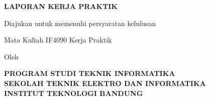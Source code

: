 \begin{titlepage}
\begin{center}
\vspace*{0.3cm}
{\bfseries\Large LAPORAN KERJA PRAKTIK\par}
\vspace{0.7cm}
{\bfseries\large \JudulLaporan\par}
\vspace{0.8cm}
{Diajukan untuk memenuhi persyaratan kelulusan\par Mata Kuliah IF4090 Kerja Praktik\par}
\vspace{0.6cm}
{Oleh\par}
\vspace{0.2cm}
\NamaBerdua
\vfill
\LogoITB
\vfill
{\bfseries PROGRAM STUDI TEKNIK INFORMATIKA\\SEKOLAH TEKNIK ELEKTRO DAN INFORMATIKA\\INSTITUT TEKNOLOGI BANDUNG\\\Tahun\par}
\end{center}
\end{titlepage}
